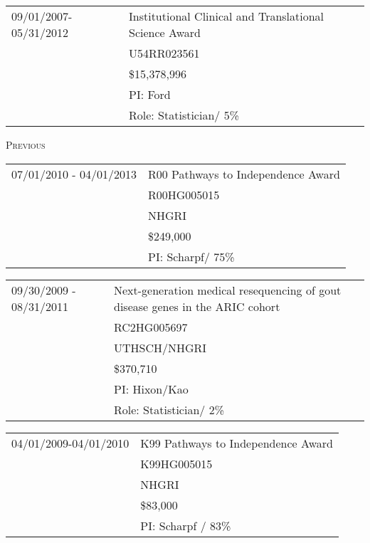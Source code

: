 \documentclass[11pt]{article}%
\begin{document}
\vspace{0.5em}


\begin{tabular}{ll}
  09/01/2007-05/31/2012 & Institutional Clinical and Translational Science Award\\
  &U54RR023561\\
  &\$15,378,996\\
  &PI: Ford\\
  &Role: Statistician/ 5\% \\
\end{tabular}


%

\vspace{0.5em}
\noindent \textsc{Previous}

\begin{tabular}{ll}
  07/01/2010 - 04/01/2013 & R00 Pathways to Independence Award \\
  & R00HG005015\\
  & NHGRI \\
  & \$249,000 \\
  & PI: Scharpf/ 75\%\\
\end{tabular}

\begin{tabular}{ll}
  09/30/2009 - 08/31/2011 & Next-generation medical resequencing of gout disease genes in the ARIC cohort\\
  & RC2HG005697\\
  & UTHSCH/NHGRI \\
  & \$370,710 \\
  & PI: Hixon/Kao\\
  & Role: Statistician/ 2\% \\
\end{tabular}

\vspace{0.5em}

\begin{tabular}{ll}
04/01/2009-04/01/2010 & K99 Pathways to Independence Award \\
& K99HG005015\\
& NHGRI \\
& \$83,000\\
& PI: Scharpf / 83\%\\
\end{tabular}
\end{document}
